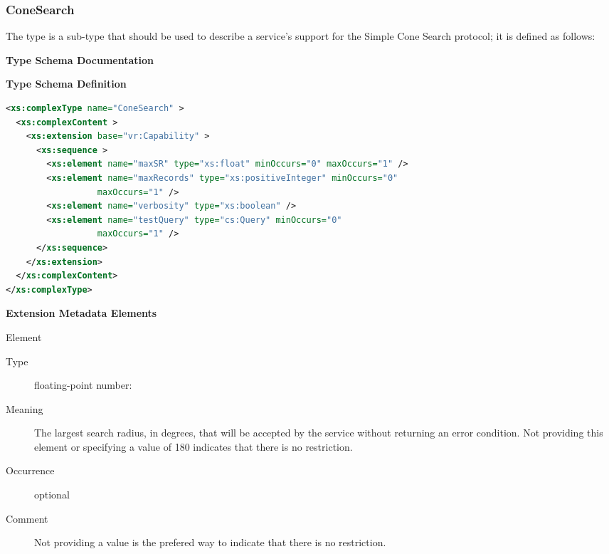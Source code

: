 \documentclass[11pt,a4paper]{ivoa}
\begin{document}
\subsubsection{ConeSearch}

   The  type is a  sub-type that should be used
   to describe a service's support for the Simple Cone Search protocol;
   it is defined as follows:

\begin{generated}
\begingroup
        \renewcommand*\descriptionlabel[1]{%
        \hbox to 5.5em{\emph{#1}\hfil}}\vspace{2ex}\noindent\textbf{ Type Schema Documentation}


\vspace{1ex}\noindent\textbf{ Type Schema Definition}

\begin{lstlisting}[language=XML,basicstyle=\footnotesize]
<xs:complexType name="ConeSearch" >
  <xs:complexContent >
    <xs:extension base="vr:Capability" >
      <xs:sequence >
        <xs:element name="maxSR" type="xs:float" minOccurs="0" maxOccurs="1" />
        <xs:element name="maxRecords" type="xs:positiveInteger" minOccurs="0"
                  maxOccurs="1" />
        <xs:element name="verbosity" type="xs:boolean" />
        <xs:element name="testQuery" type="cs:Query" minOccurs="0"
                  maxOccurs="1" />
      </xs:sequence>
    </xs:extension>
  </xs:complexContent>
</xs:complexType>
\end{lstlisting}

\vspace{0.5ex}\noindent\textbf{ Extension Metadata Elements}

\begingroup\small\begin{bigdescription}\item[Element \xmlel{maxSR}]
\begin{description}
\item[Type] floating-point number: 
\item[Meaning] The largest search radius, in degrees, that will be
                        accepted by the service without returning an error
                        condition.  Not providing this element or
                        specifying a value of 180 indicates that there
                        is no restriction.
\item[Occurrence] optional
\item[Comment] Not providing a value is the prefered way to indicate
                        that there is no restriction.


\end{description}
\end{bigdescription}
\end{generated}
\end{document}
